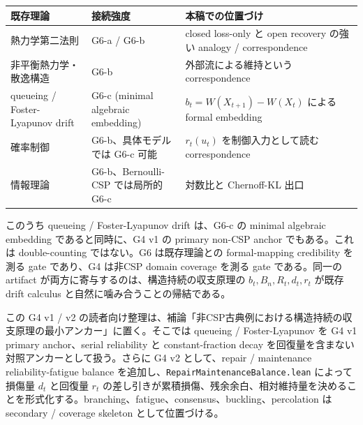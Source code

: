 \documentclass[12pt,a4paper]{article}
\begin{document}
{\def\LTcaptype{table} %
\begin{longtable}[]{@{}
  >{\raggedright\arraybackslash}p{}
  >{\raggedright\arraybackslash}p{}
  >{\raggedright\arraybackslash}p{}@{}}
\toprule\noalign{}
\begin{minipage}[b]{\linewidth}\raggedright
既存理論
\end{minipage} & \begin{minipage}[b]{\linewidth}\raggedright
接続強度
\end{minipage} & \begin{minipage}[b]{\linewidth}\raggedright
本稿での位置づけ
\end{minipage} \\
\midrule\noalign{}
\endhead
\bottomrule\noalign{}
\endlastfoot
熱力学第二法則 & G6-a / G6-b & closed loss-only と open recovery の強い analogy / correspondence \\
非平衡熱力学・散逸構造 & G6-b & 外部流による維持という correspondence \\
queueing / Foster-Lyapunov drift & G6-c (minimal algebraic embedding) & \(b_t=W(X_{t+1})-W(X_t)\) による formal embedding \\
確率制御 & G6-b、具体モデルでは G6-c 可能 & \(r_t(u_t)\) を制御入力として読む correspondence \\
情報理論 & G6-b、Bernoulli-CSP では局所的 G6-c & 対数比と Chernoff-KL 出口 \\
\end{longtable}
}

このうち queueing / Foster-Lyapunov drift は、G6-c の minimal algebraic embedding であると同時に、G4 v1 の primary non-CSP anchor でもある。これは double-counting ではない。G6 は既存理論との formal-mapping credibility を測る gate であり、G4 は非CSP domain coverage を測る gate である。同一の artifact が両方に寄与するのは、構造持続の収支原理の \(b_{t},B_{n},R_{t},d_{t},r_{t}\) が既存 drift calculus と自然に噛み合うことの帰結である。

この G4 v1 / v2 の読者向け整理は、補論「非CSP古典例における構造持続の収支原理の最小アンカー」に置く。そこでは queueing / Foster-Lyapunov を G4 v1 primary anchor、serial reliability と constant-fraction decay を回復量を含まない対照アンカーとして扱う。さらに G4 v2 として、repair / maintenance reliability-fatigue balance を追加し、\texttt{RepairMaintenanceBalance.lean} によって損傷量 \(d_{t}\) と回復量 \(r_{t}\) の差し引きが累積損傷、残余余白、相対維持量を決めることを形式化する。branching、fatigue、consensus、buckling、percolation は secondary / coverage skeleton として位置づける。
\end{document}
